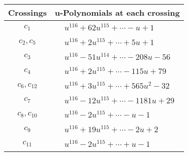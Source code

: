 \documentclass[1p]{elsarticle_modified}
\theoremstyle{definition}
\begin{document}
\begin{tabular}{m{50pt}|m{274pt}}
Crossings & \hspace{64pt}u-Polynomials at each crossing \\
\hline $$\begin{aligned}c_{1}\end{aligned}$$&$\begin{aligned}
&u^{116}+62 u^{115}+\cdots- u+1
\end{aligned}$\\
\hline $$\begin{aligned}c_{2},c_{5}\end{aligned}$$&$\begin{aligned}
&u^{116}+2 u^{115}+\cdots+5 u+1
\end{aligned}$\\
\hline $$\begin{aligned}c_{3}\end{aligned}$$&$\begin{aligned}
&u^{116}-51 u^{114}+\cdots-208 u-56
\end{aligned}$\\
\hline $$\begin{aligned}c_{4}\end{aligned}$$&$\begin{aligned}
&u^{116}+2 u^{115}+\cdots-115 u+79
\end{aligned}$\\
\hline $$\begin{aligned}c_{6},c_{12}\end{aligned}$$&$\begin{aligned}
&u^{116}+3 u^{115}+\cdots+565 u^2-32
\end{aligned}$\\
\hline $$\begin{aligned}c_{7}\end{aligned}$$&$\begin{aligned}
&u^{116}-12 u^{115}+\cdots-1181 u+29
\end{aligned}$\\
\hline $$\begin{aligned}c_{8},c_{10}\end{aligned}$$&$\begin{aligned}
&u^{116}-2 u^{115}+\cdots- u-1
\end{aligned}$\\
\hline $$\begin{aligned}c_{9}\end{aligned}$$&$\begin{aligned}
&u^{116}+19 u^{115}+\cdots-2 u+2
\end{aligned}$\\
\hline $$\begin{aligned}c_{11}\end{aligned}$$&$\begin{aligned}
&u^{116}-2 u^{115}+\cdots+u-1
\end{aligned}$\\
\hline
\end{tabular}\\~\\
\end{document}
